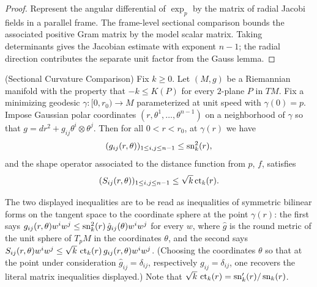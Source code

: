 \begin{proof}
\sketch
{}

Represent the angular differential of $\exp_p$ by the matrix of radial Jacobi fields in a parallel frame. The frame-level sectional comparison bounds the associated positive Gram matrix by the model scalar matrix. Taking determinants gives the Jacobian estimate with exponent $n-1$; the radial direction contributes the separate unit factor from the Gauss lemma.
\end{proof}


\begin{theorem}
\label{thm:sectional-curvature-comparison}

\label{SCC}



(Sectional Curvature Comparison) Fix $k\ge 0$. Let $(M, g)$ be a
Riemannian manifold with the property that $-k \leq K(P)$ for every
$2$-plane $P$ in $TM$. Fix a minimizing geodesic $\gamma\colon
[0,r_0)\to M$ parameterized at unit speed with $\gamma(0)=p$. Impose
Gaussian polar coordinates $(r,\theta^1,\ldots,\theta^{n-1})$ on a
neighborhood of $\gamma$ so that $g=dr^2+g_{ij}\theta^i\otimes
\theta^j$. Then for all $0<r<r_0$, at $\gamma(r)$ we have
$$ (g_{ij}(r,\theta))_{1 \leq
i,j \leq n-1} \leq \operatorname{sn}_{k}^{2}(r),$$ and the shape operator
associated to  the distance function from $p$, $f$, satisfies
$$(S_{ij}(r,\theta))_{1 \leq i,j \leq n-1} \leq \sqrt{k}\operatorname{ct}_{k}(r).$$
\end{theorem}

The two displayed inequalities are to be read as inequalities of
symmetric bilinear forms on the tangent space to the coordinate
sphere at the point $\gamma(r)$: the first says $g_{ij}(r,\theta)w^iw^j\le
\operatorname{sn}_k^2(r)\,\hat g_{ij}(\theta)w^iw^j$ for every $w$, where $\hat g$
is the round metric of the unit sphere of $T_pM$ in the coordinates
$\theta$, and the second says $S_{ij}(r,\theta)w^iw^j\le
\sqrt{k}\,\operatorname{ct}_k(r)\,g_{ij}(r,\theta)w^iw^j$. (Choosing the
coordinates $\theta$ so that at the point under consideration
$\hat g_{ij}=\delta_{ij}$, respectively $g_{ij}=\delta_{ij}$, one
recovers the literal matrix inequalities displayed.) Note that
$\sqrt k\,\operatorname{ct}_k(r)=\operatorname{sn}_k'(r)/\operatorname{sn}_k(r)$.

